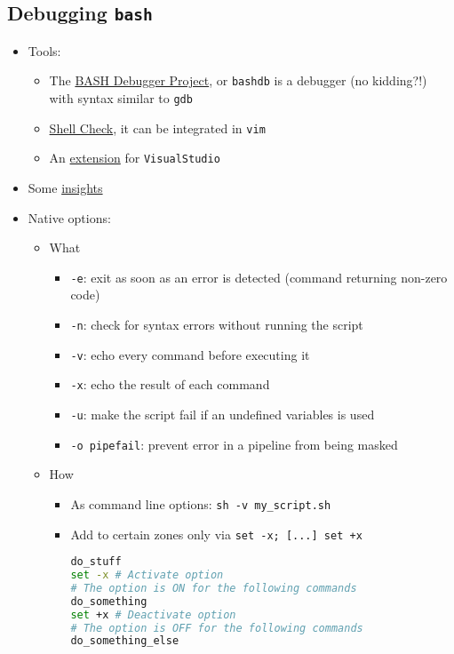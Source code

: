 \documentclass[a4paper,12pt,%
              final%
              ]{article}
\begin{document}
\subsection{Debugging \texttt{bash}}
\begin{itemize}
  \item Tools:
  \begin{itemize}
    \item The \href{https://bashdb.sourceforge.net/}{BASH Debugger Project}, or \texttt{bashdb} is a debugger (no kidding?!) with syntax similar to \texttt{gdb}
    \item \href{https://github.com/koalaman/shellcheck}{Shell Check}, it can be integrated in \texttt{vim}
    \item An \href{https://marketplace.visualstudio.com/items?itemName=rogalmic.bash-debug}{extension} for \texttt{VisualStudio}
  \end{itemize}
  \item Some \href{https://www.linuxtopia.org/online_books/advanced_bash_scripting_guide/debugging.html}{insights}
  \item Native options:
    \begin{itemize}
      \item What
        \begin{itemize}
          \item \verb|-e|: exit as soon as an error is detected (command returning non-zero code)
          \item \verb|-n|: check for syntax errors without running the script
          \item \verb|-v|: echo every command before executing it
          \item \verb|-x|: echo the result of each command
          \item \verb|-u|: make the script fail if an undefined variables is used
          \item \verb|-o pipefail|: prevent error in a pipeline from being masked
        \end{itemize}
      \item How
        \begin{itemize}
          \item As command line options: \verb|sh -v my_script.sh|
          \item Add to certain zones only via \verb|set -x; [...] set +x|
\begin{lstlisting}[language=sh]
do_stuff
set -x # Activate option
# The option is ON for the following commands
do_something
set +x # Deactivate option
# The option is OFF for the following commands
do_something_else
\end{lstlisting}
        \end{itemize}
    \end{itemize}
\end{itemize}
\end{document}

